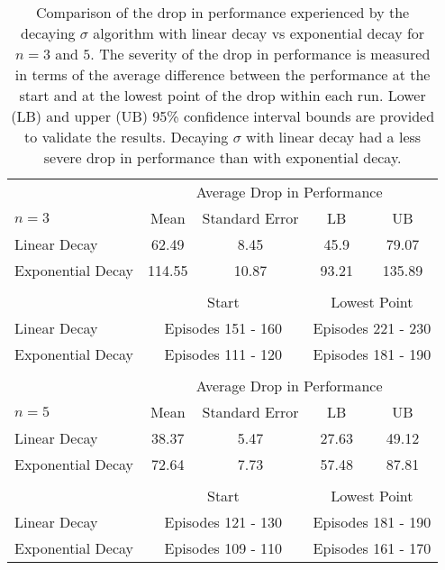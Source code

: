 \begin{table}[t] 
\caption[Comparison of the Drop in Performance Experienced by the Decaying $\sigma$ Algorithm with Linear Decay vs Exponential Decay for $n = 3$ and $5$]{Comparison of the drop in performance experienced by the decaying $\sigma$ algorithm with linear decay vs exponential decay for $n = 3$ and $5$. 
The severity of the drop in performance is measured in terms of the average difference between the performance at the start and at the lowest point of the drop within each run.
Lower (LB) and upper (UB) 95\% confidence interval bounds are provided to validate the results.
Decaying $\sigma$ with linear decay had a less severe drop in performance than with exponential decay.
}
\label{tbl:exp_vs_lin_decay}
\begin{center}
\begin{tabular}{lcccc}
\toprule
& \multicolumn{4}{c}{Average Drop in Performance} \\
\cmidrule{2-5}
$n = 3$ & Mean & Standard Error & LB & UB \\
\midrule
Linear Decay 		& 62.49     & 8.45  & 45.9  & 79.07     \\
Exponential Decay   & 114.55    & 10.87 & 93.21 & 135.89    \\
&&&& \\
& \multicolumn{2}{c}{Start} & \multicolumn{2}{c}{Lowest Point}  \\
\cmidrule(l){2-3} \cmidrule(l){4-5}
Linear Decay        & \multicolumn{2}{c}{Episodes 151 - 160}   & \multicolumn{2}{c}{Episodes 221 - 230} \\
Exponential Decay   & \multicolumn{2}{c}{Episodes 111 - 120}   & \multicolumn{2}{c}{Episodes 181 - 190} \\
\bottomrule
&&&& \\
\toprule
& \multicolumn{4}{c}{Average Drop in Performance} \\
\cmidrule{2-5}
$n = 5$ & Mean & Standard Error & LB & UB \\
\midrule
Linear Decay 		& 38.37 & 5.47  & 27.63 & 49.12 \\
Exponential Decay   & 72.64 & 7.73  & 57.48 & 87.81 \\
&&&& \\
& \multicolumn{2}{c}{Start} & \multicolumn{2}{c}{Lowest Point}  \\
\cmidrule(l){2-3} \cmidrule(l){4-5}
Linear Decay        & \multicolumn{2}{c}{Episodes 121 - 130}   & \multicolumn{2}{c}{Episodes 181 - 190} \\
Exponential Decay   & \multicolumn{2}{c}{Episodes 109 - 110}   & \multicolumn{2}{c}{Episodes 161 - 170} \\
\bottomrule
\end{tabular}
\end{center}
\end{table}

